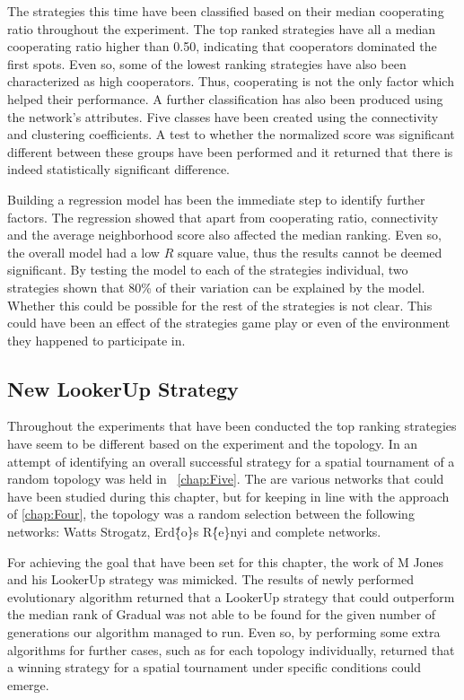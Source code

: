 The strategies this time have been classified based on their median cooperating
ratio throughout the experiment. The top ranked strategies have all a median cooperating
ratio higher than 0.50, indicating that cooperators
dominated the first spots. Even so, some of the lowest ranking strategies have
also been characterized as high cooperators. Thus, cooperating is not the only
factor which helped their performance. A further classification has also been
produced using the network's attributes. Five classes have been created using
the connectivity and clustering coefficients. A test to whether the normalized
score was significant different between these groups have been performed and it
returned that there is indeed statistically significant difference.

Building a regression model has been the immediate step to identify further factors.
The regression showed that apart from cooperating ratio, connectivity and the
average neighborhood score also affected the median ranking. Even so, the overall model
had a low \(R\) square value, thus the results cannot be deemed significant. By testing
the model to each of the strategies individual, two strategies shown that 80\% of
their variation can be explained by the model. Whether this could be possible
for the rest of the strategies is not clear. This could have been an effect of
the strategies game play or even of the environment they happened to participate in.

\subsection{New LookerUp Strategy}

Throughout the experiments that have been conducted the top ranking strategies
have seem to be different based on the experiment and the topology. In an attempt
of identifying an overall successful strategy for a spatial tournament of
a random topology was held in ~\autoref{chap:Five}. The are various networks
that could have been studied during this chapter, but for keeping in line with
the approach of \autoref{chap:Four}, the topology was a random selection between
the following networks: Watts Strogatz, Erd\"\{o\}s R\'\{e\}nyi and complete networks.

For achieving the goal that have been set for this chapter, the work of
M Jones and his LookerUp strategy was mimicked. The results of newly performed
evolutionary algorithm returned that a LookerUp strategy that could outperform
the median rank of Gradual was not able to be found for the given number of generations
our algorithm managed to run. Even so, by performing some extra algorithms for further
cases, such as for each topology individually, returned that a winning strategy for
a spatial tournament under specific conditions could emerge.

